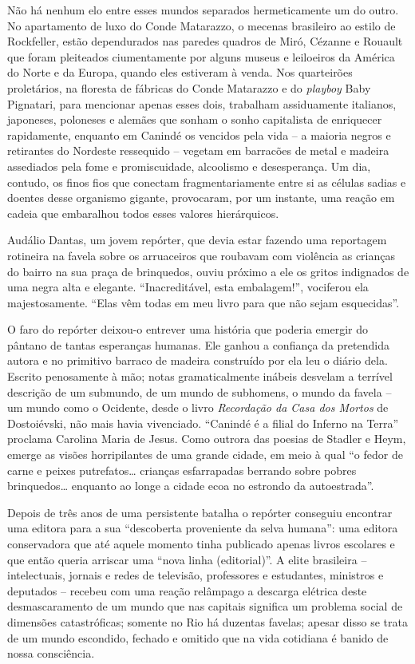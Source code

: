 \documentclass[
  letterpaper,
  DIV=11,
  numbers=noendperiod]{scrreprt}
\begin{document}
Não há nenhum elo entre esses mundos separados hermeticamente um do
outro. No apartamento de luxo do Conde Matarazzo, o mecenas brasileiro
ao estilo de Rockfeller, estão dependurados nas paredes quadros de Miró,
Cézanne e Rouault que foram pleiteados ciumentamente por alguns museus e
leiloeiros da América do Norte e da Europa, quando eles estiveram à
venda. Nos quarteirões proletários, na floresta de fábricas do Conde
Matarazzo e do \emph{playboy} Baby Pignatari, para mencionar apenas
esses dois, trabalham assiduamente italianos, japoneses, poloneses e
alemães que sonham o sonho capitalista de enriquecer rapidamente,
enquanto em Canindé os vencidos pela vida -- a maioria negros e
retirantes do Nordeste ressequido -- vegetam em barracões de metal e
madeira assediados pela fome e promiscuidade, alcoolismo e desesperança.
Um dia, contudo, os finos fios que conectam fragmentariamente entre si
as células sadias e doentes desse organismo gigante, provocaram, por um
instante, uma reação em cadeia que embaralhou todos esses valores
hierárquicos.

Audálio Dantas, um jovem repórter, que devia estar fazendo uma
reportagem rotineira na favela sobre os arruaceiros que roubavam com
violência as crianças do bairro na sua praça de brinquedos, ouviu
próximo a ele os gritos indignados de uma negra alta e elegante.
``Inacreditável, esta embalagem!'', vociferou ela majestosamente. ``Elas
vêm todas em meu livro para que não sejam esquecidas''.

O faro do repórter deixou-o entrever uma história que poderia emergir do
pântano de tantas esperanças humanas. Ele ganhou a confiança da
pretendida autora e no primitivo barraco de madeira construído por ela
leu o diário dela. Escrito penosamente à mão; notas gramaticalmente
inábeis desvelam a terrível descrição de um submundo, de um mundo de
subhomens, o mundo da favela -- um mundo como o Ocidente, desde o livro
\emph{Recordação da Casa dos Mortos} de Dostoiévski, não mais havia
vivenciado. ``Canindé é a filial do Inferno na Terra'' proclama Carolina
Maria de Jesus. Como outrora das poesias de Stadler e Heym, emerge as
visões horripilantes de uma grande cidade, em meio à qual ``o fedor de
carne e peixes putrefatos\ldots{} crianças esfarrapadas berrando sobre
pobres brinquedos\ldots{} enquanto ao longe a cidade ecoa no estrondo da
autoestrada''.

Depois de três anos de uma persistente batalha o repórter conseguiu
encontrar uma editora para a sua ``descoberta proveniente da selva
humana'': uma editora conservadora que até aquele momento tinha
publicado apenas livros escolares e que então queria arriscar uma ``nova
linha (editorial)''. A elite brasileira -- intelectuais, jornais e redes
de televisão, professores e estudantes, ministros e deputados -- recebeu
com uma reação relâmpago a descarga elétrica deste desmascaramento de um
mundo que nas capitais significa um problema social de dimensões
catastróficas; somente no Rio há duzentas favelas; apesar disso se trata
de um mundo escondido, fechado e omitido que na vida cotidiana é banido
de nossa consciência.
\end{document}
